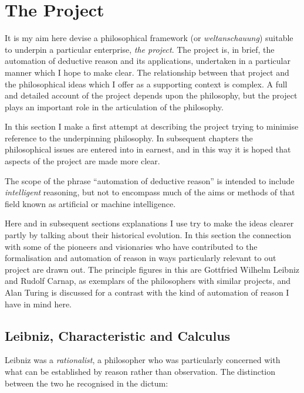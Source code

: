 \def\rbjidtheproject{$$Id: theproject.tex,v 1.3 2011/11/04 16:38:42 rbj Exp $$}

\chapter{The Project}\label{TheProject}

It is my aim here devise a philosophical framework (or \emph{weltanschauung}) suitable to underpin a particular enterprise, \emph{the project}.
The project is, in brief, the automation of deductive reason and its applications, undertaken in a particular manner which I hope to make clear.
The relationship between that project and the philosophical ideas which I offer as a supporting context is complex.
A full and detailed account of the project depends upon the philosophy, but the project plays an important role in the articulation of the philosophy.

In this section I make a first attempt at describing the project trying to minimise reference to the underpinning philosophy.
In subsequent chapters the philosophical issues are entered into in earnest, and in this way it is hoped that aspects of the project are made more clear.

The scope of the phrase ``automation of deductive reason'' is intended to include \emph{intelligent} reasoning, but not to encompass much of the aims or methods of that field known as artificial or machine intelligence.

Here and in subsequent sections explanations I use try to make the ideas clearer partly by talking about their historical evolution.
In this section the connection with some of the pioneers and visionaries who have contributed to the formalisation and automation of reason in ways particularly relevant to out project are drawn out.
The principle figures in this are Gottfried Wilhelm Leibniz and Rudolf Carnap, as exemplars of the philosophers with similar projects, and Alan Turing is discussed for a contrast with the kind of automation of reason I have in mind here.

\section{Leibniz, Characteristic and Calculus}

Leibniz was a \emph{rationalist}, a philosopher who was particularly concerned with what can be established by reason rather than observation.
The distinction between the two he recognised in the dictum:

